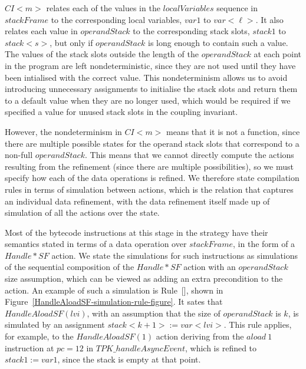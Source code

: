 $CI{<}m{>}$ relates each of the values in the $localVariables$
sequence in $stackFrame$ to the corresponding local variables, $var1$
to $var{<}\ell{>}$.
It also relates each value in $operandStack$ to the corresponding
stack slots, $stack1$ to $stack{<}s{>}$, but only if $operandStack$ is
long enough to contain such a value.
The values of the stack slots outside the length of the $operandStack$
at each point in the program are left nondeterministic, since they are
not used until they have been intialised with the correct value.
This nondeterminism allows us to avoid introducing unnecessary
assignments to initialise the stack slots and return them to a default
value when they are no longer used, which would be required if we
specified a value for unused stack slots in the coupling invariant.

However, the nondeterminism in $CI{<}m{>}$ means that it is not a
function, since there are multiple possible states for the operand
stack slots that correspond to a non-full $operandStack$.
This means that we cannot directly compute the actions resulting from
the refinement (since there are multiple possibilities), so we must
specify how each of the data operations is refined.
We therefore state compilation rules in terms of \Circus{} simulation
between actions, which is the relation that captures an individual
data refinement, with the data refinement itself made up of simulation
of all the actions over the state.

Most of the bytecode instructions at this stage in the strategy have
their semantics stated in terms of a data operation over $stackFrame$,
in the form of a $Handle*SF$ action.
We state the simulations for such instructions as simulations of the
sequential composition of the $Handle*SF$ action with an
$operandStack$ size assumption, which can be viewed as adding an extra
precondition to the action.
An example of such a simulation is
Rule~[], shown in
Figure~\ref{HandleAloadSF-simulation-rule-figure}.
It sates that $HandleAloadSF(lvi)$, with an assumption that the size
of $operandStack$ is $k$, is simulated by an assignment
$stack{<}k+1{>} := var{<}lvi{>}$.
This rule applies, for example, to the $HandleAloadSF(1)$ action
deriving from the $aload~1$ instruction at $pc = 12$ in
$TPK\_handleAsyncEvent$, which is refined to $stack1 := var1$, since
the stack is empty at that point.

